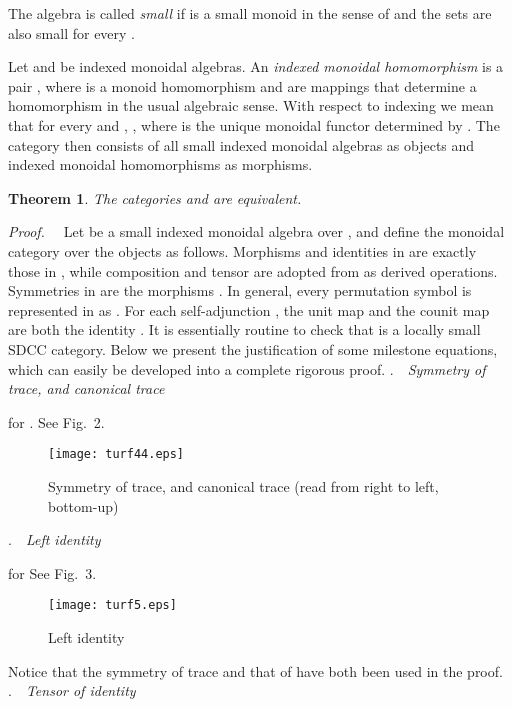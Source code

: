 \documentclass{eptcs}
\newtheorem{theorem}{Theorem}
\begin{document}
The algebra  is called {\em small\/} if  is a small monoid 
in the sense of \cite{mcl} and the
sets  are also small for every .

  Let  and  be indexed monoidal algebras. An {\em indexed monoidal 
homomorphism\/}  is a pair , where
 is a monoid homomorphism 
and  are mappings
that determine a homomorphism in the usual algebraic sense. With respect to indexing
we mean that for every  and , , where  is the unique monoidal functor  determined
by . The category  then consists of all small indexed monoidal
algebras as objects and indexed monoidal homomorphisms as morphisms.
\begin{theorem}
The categories  and  are equivalent.
\end{theorem}
{\em Proof.\ \ }
Let  be a small indexed monoidal algebra over , and define the monoidal category
 over the objects  as follows.
Morphisms  and identities in  are exactly those in , while
composition and tensor are adopted from  as derived operations.
Symmetries  in  are the morphisms 
.
In general, every permutation symbol  is represented in 
as . 
For each self-adjunction , the unit
map  and the counit map  are both the 
identity . It is essentially routine to check that 
is a locally small SDCC category. Below we present the justification of some milestone
equations, which can easily be developed into a complete rigorous proof.
.\ \ {\em Symmetry of trace, and canonical trace}
\vsp

     for .
\vspp\newline
See Fig.\ 2.
\begin{figure}[h]
\begin{center}
\texttt{[image: turf44.eps]}
\end{center}
\vspmini
\caption{Symmetry of trace, and canonical trace (read from right to left, bottom-up)}
\end{figure}
.\ \ {\em Left identity}
\vsp
 
      for 
\vspp\newline
See Fig.\ 3.
\begin{figure}
\begin{center}
\texttt{[image: turf5.eps]}
\end{center}
\vspmini
\caption{Left identity}
\end{figure}
\newline
Notice that the symmetry of trace and that of  have both been used in
the proof.
.\ \ {\em Tensor of identity}
\vsp
\end{document}
